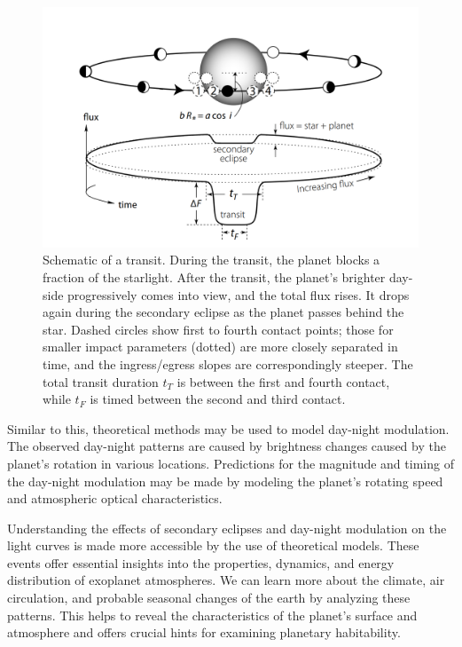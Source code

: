 \documentclass{article}
\begin{document}
\begin{figure}[H]
    \centering
    \includegraphics[width=1\linewidth]{image/transit_sample_model.jpg}
    \captionsetup{font=small} 
    \caption{Schematic of a transit. During the transit, the planet blocks a fraction of the starlight. After the transit, the planet’s brighter day-side progressively comes into view, and the total flux rises. It drops again during the secondary eclipse as the planet passes behind the star. Dashed circles show first to fourth contact points; those for smaller impact parameters (dotted) are more closely separated in time, and the ingress/egress slopes are correspondingly steeper. The total transit duration $t_{T}$ is between the first and fourth contact, while $t_{F}$ is timed between the second and third contact.}
    \label{fig:transit_sm}
\end{figure}

Similar to this, theoretical methods may be used to model day-night modulation. The observed day-night patterns are caused by brightness changes caused by the planet's rotation in various locations. Predictions for the magnitude and timing of the day-night modulation may be made by modeling the planet's rotating speed and atmospheric optical characteristics.

Understanding the effects of secondary eclipses and day-night modulation on the light curves is made more accessible by the use of theoretical models. These events offer essential insights into the properties, dynamics, and energy distribution of exoplanet atmospheres. We can learn more about the climate, air circulation, and probable seasonal changes of the earth by analyzing these patterns. This helps to reveal the characteristics of the planet's surface and atmosphere and offers crucial hints for examining planetary habitability.
\end{document}
